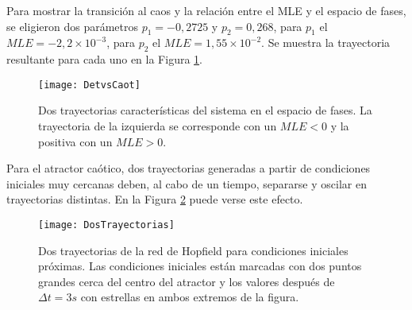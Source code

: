 Para mostrar la transición al caos y la relación entre el MLE y el espacio de fases, se eligieron dos parámetros $p_1 = -0,2725$ y $p_2 = 0,268$, para $p_1$ el $MLE = -2,2\times10^{-3}$, para $p_2$ el $MLE = 1,55\times10^{-2}$.
Se muestra la trayectoria resultante para cada uno en la Figura \ref{fig:DetvsCaot}.
\begin{figure}
	\centering
	\texttt{[image: DetvsCaot]}\\
	\caption{Dos trayectorias características del sistema en el espacio de fases. La trayectoria de la izquierda se corresponde con un $MLE < 0$ y la positiva con un $MLE > 0$.}
	\label{fig:DetvsCaot}
\end{figure}

Para el atractor caótico, dos trayectorias generadas a partir de condiciones iniciales muy cercanas deben, al cabo de un tiempo, separarse y oscilar en trayectorias distintas.
En la Figura \ref{fig:DosTrayectorias} puede verse este efecto.
\begin{figure}
	\centering
	\texttt{[image: DosTrayectorias]}\\
	\caption{Dos trayectorias de la red de Hopfield para condiciones iniciales próximas.
		Las condiciones iniciales están marcadas con dos puntos grandes cerca del centro del atractor y los	valores después de $\Delta t = 3s$ con estrellas en ambos extremos de la figura.}
	\label{fig:DosTrayectorias}
\end{figure}